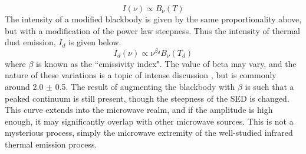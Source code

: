 \begin{equation}
I(\nu) \propto B_\nu{}(T)
\label{BBintensity}
\end{equation}
The intensity of a modified blackbody is given by the same proportionality above, but with a modification of the power law steepness. Thus the intensity of thermal dust emission, $I_d$ is given below. 
\begin{equation}
I_d(\nu) \propto \nu{}^{\beta{}_d}B_\nu{}(T_d)
\end{equation}
where $\beta$ is known as the ``emissivity index". The value of beta may vary, and the nature of these variations is a topic of intense discussion \citep{galliano11,juvela12}, but is commonly around 2.0 $\pm$ 0.5. The result of augmenting the blackbody with $\beta$ is such that a peaked continuum is still present, though the steepness of the SED is changed. 
     This curve extends into the microwave realm, and if the amplitude is high enough, it may significantly overlap with other microwave sources. This is not a mysterious process, simply the microwave extremity of the well-studied infrared thermal emission process.
